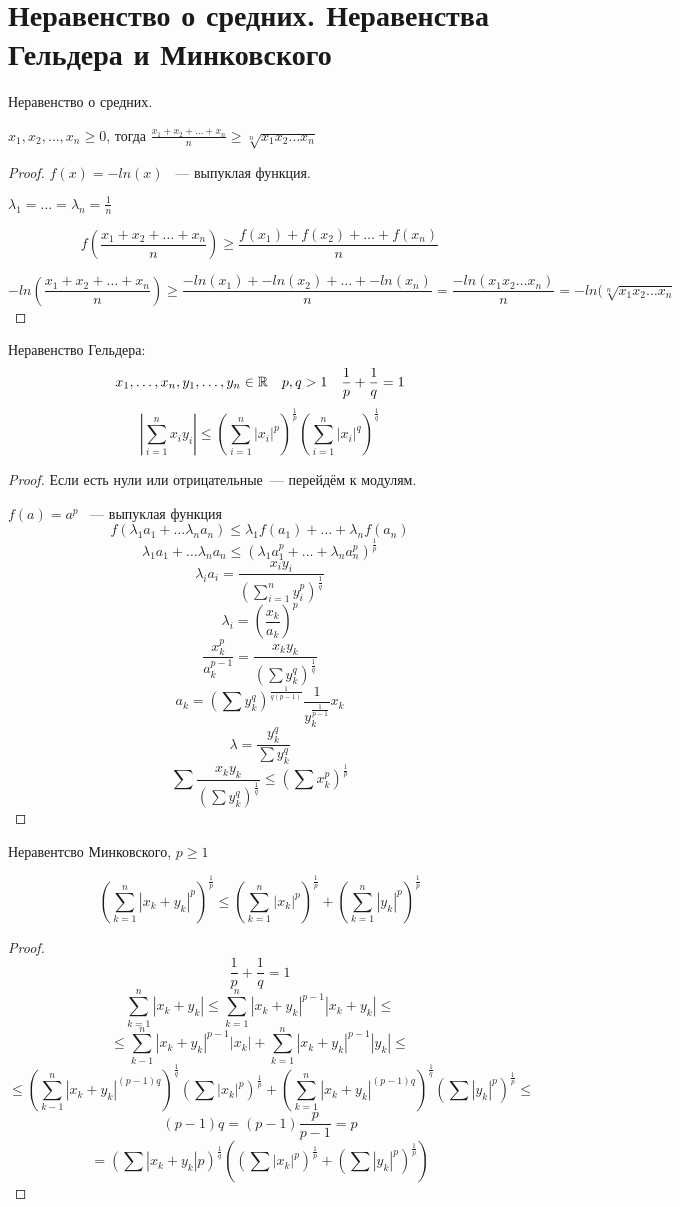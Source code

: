 ﻿\section{Неравенство о средних. Неравенства Гельдера и Минковского}

\begin{conseq}
Неравенство о средних.

$x_1, x_2, \ldots, x_n \ge 0$, тогда $\frac{x_1 + x_2 + \ldots + x_n}{n} \ge \sqrt[n]{x_1x_2\ldots x_n}$
\end{conseq}

\begin{proof}
$f(x) = -ln(x)$ ~--- выпуклая функция.

$\lambda_1 = \ldots = \lambda_n = \frac1n$

$$f(\frac{x_1 + x_2 + \ldots + x_n}{n}) \ge \frac{f(x_1) + f(x_2) + \ldots + f(x_n)}{n}$$

$$-ln(\frac{x_1 + x_2 + \ldots + x_n}{n}) \ge \frac{-ln(x_1) + -ln(x_2) + \ldots + -ln(x_n)}{n} = \frac{-ln(x_1x_2\ldots x_n)}{n} = -ln(\sqrt[n]{x_1x_2\ldots x_n}$$


\end{proof}
\begin{conseq}
Неравенство Гельдера:
$$x_1, \ldots, x_n, y_1, \ldots, y_n \in \mathbb{R} \quad p,q > 1 \quad \frac1p + \frac1q = 1$$
$$\left|\sum_{i=1}^n x_iy_i\right| \leqslant \left(\sum_{i=1}^n |x_i|^p\right)^{\frac1p} \left(\sum_{i=1}^n |x_i|^q\right)^{\frac1q}$$
\end{conseq}
\begin{proof}
Если есть нули или отрицательные~--- перейдём к модулям.

$f(a) = a^p$  ~--- выпуклая функция
$$f\left( \lambda_1 a_1 + \ldots \lambda_n a_n \right) \le \lambda_1 f(a_1) + \ldots + \lambda_n f(a_n) $$
$$\lambda_1 a_1 + \ldots \lambda_n a_n \le (\lambda_1 a_1^p + \ldots + \lambda_n a_n^p)^{\frac1p} $$
$$ \lambda_i a_i = \frac{x_iy_i}{(\sum_{i=1}^n y_i^p) ^ {\frac1q}}$$
$$\lambda_i  = (\frac{x_k}{a_k})^p$$ 
$$\frac{x_k^{p}}{a_k^{p - 1}} =\frac{x_k y_k}{(\sum y_k^q)^{\frac1q}} $$
$$a_k = (\sum y_k^q)^{\frac{1}{q(p - 1)}}\frac{1}{y_k^{\frac1{p - 1}}}x_k$$
$$\lambda = \frac{y_k^q}{\sum y_k^q}$$
$$\sum\frac{x_k y_k}{(\sum y_k ^q)^{\frac1q}} \le (\sum x_k^p)^{\frac1p} $$
\end{proof}

\begin{conseq}
Неравентсво Минковского, $p \ge 1$

$$(\sum_{k = 1}^{n}|x_k + y_k|^p)^{\frac1p} \le (\sum_{k = 1}^{n}|x_k|^p)^{\frac{1}{p}} + (\sum_{k = 1}^{n}|y_k|^p)^{\frac{1}{p}}$$
\end{conseq}

\begin{proof}
$$\frac1p + \frac1q = 1$$
$$\sum_{k = 1}^{n}|x_k + y_k| \le \sum_{k = 1}^{n}|x_k + y_k|^{p - 1}|x_k + y_k| \le $$
$$ \le \sum_{k - 1}^{n}|x_k + y_k|^{p - 1}|x_k| + \sum_{k = 1}^{n}|x_k + y_k|^{p - 1}|y_k| \le $$
$$ \le (\sum_{k - 1}^{n}|x_k + y_k|^{(p - 1)q})^{\frac1q}(\sum|x_k|^p)^{\frac{1}{p}} + (\sum_{k = 1}^{n}|x_k + y_k|^{(p - 1)q})^{\frac1q}(\sum|y_k|^p)^{\frac{1}{p}} \le $$
$$ (p - 1)q = (p - 1) \frac{p}{p - 1} = p$$
$$ = (\sum|x_k + y_k|p)^{\frac{1}{q}}((\sum|x_k|^{p})^{\frac1p} + (\sum|y_k|^{p})^{\frac{1}{p}})$$
\end{proof}